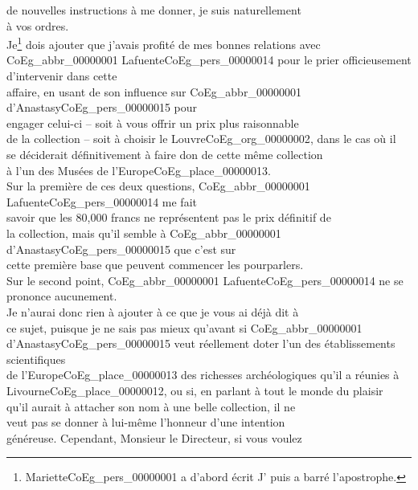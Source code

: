 \documentclass{book}
\begin{document}
de nouvelles instructions à me donner, je suis naturellement\\
à vos ordres.\\
\indent Je\footnote{Mariette\gls{CoEg_pers_00000001} a d'abord écrit \og J' \fg puis a barré l'apostrophe.} dois ajouter que j’avais profité de mes bonnes relations avec\\
\gls{CoEg_abbr_00000001} Lafuente\gls{CoEg_pers_00000014} pour le prier officieusement d’intervenir dans cette\\
affaire, en usant de son influence sur \gls{CoEg_abbr_00000001} d’Anastasy\gls{CoEg_pers_00000015} pour\\
engager celui-ci – soit à vous offrir un prix plus raisonnable\\
de la collection – soit à choisir le Louvre\gls{CoEg_org_00000002}, dans le cas où il\\
se déciderait définitivement à faire don de cette même collection\\
à l’un des Musées de l’Europe\gls{CoEg_place_00000013}.\\
\indent Sur la première de ces deux questions, \gls{CoEg_abbr_00000001} Lafuente\gls{CoEg_pers_00000014} me fait\\
savoir que les 80,000 francs ne représentent pas le prix définitif de\\
la collection, mais qu’il semble à \gls{CoEg_abbr_00000001} d’Anastasy\gls{CoEg_pers_00000015} que c’est sur\\
cette première base que peuvent commencer les pourparlers.\\
\indent Sur le second point, \gls{CoEg_abbr_00000001} Lafuente\gls{CoEg_pers_00000014} ne se prononce aucunement.\\
Je n’aurai donc rien à ajouter à ce que je vous ai déjà dit à\\
ce sujet, puisque je ne sais pas mieux qu’avant si \gls{CoEg_abbr_00000001}\\
d’Anastasy\gls{CoEg_pers_00000015} veut réellement doter l’un des établissements scientifiques\\
de l’Europe\gls{CoEg_place_00000013} des richesses archéologiques qu’il a réunies à\\
Livourne\gls{CoEg_place_00000012}, ou si, en parlant à tout le monde du plaisir\\
qu’il aurait à attacher son nom à une belle collection, il ne\\
veut pas se donner à lui-même l’honneur d’une intention\\
généreuse. Cependant, Monsieur le Directeur, si vous voulez\\
\end{document}
